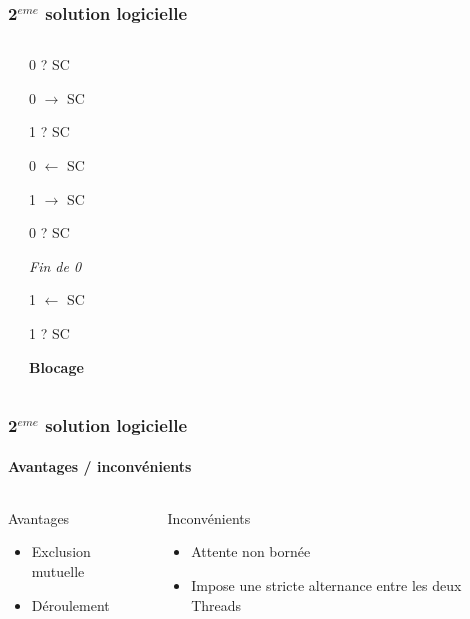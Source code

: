 \begin{frame}
\frametitle{2$^{eme}$ solution logicielle}
\begin{columns}
\begin{scriptsize}\end{scriptsize}
\begin{itemize}
\begin{scriptsize}
\item 0 ? SC
\item 0 $\rightarrow$ SC
\item 1 ? SC
\item 0 $\leftarrow$ SC
\item 1 $\rightarrow$ SC
\item 0 ? SC
\item \textit{Fin de 0}
\item 1 $\leftarrow$ SC
\item 1 ? SC
\item \textbf{Blocage}
\end{scriptsize}
\end{itemize}
\end{columns}
\end{frame}

\begin{frame}
\frametitle{2$^{eme}$ solution logicielle}
\framesubtitle{Avantages / inconvénients}
\begin{columns}
\begin{block}{Avantages}
\begin{itemize}
\item Exclusion mutuelle
\item Déroulement
\end{itemize}
\end{block}
\begin{block}{Inconvénients}
\begin{itemize}
\item Attente non bornée
\item Impose une stricte alternance entre les deux Threads
\end{itemize}
\end{block}
\end{columns}
\end{frame}

